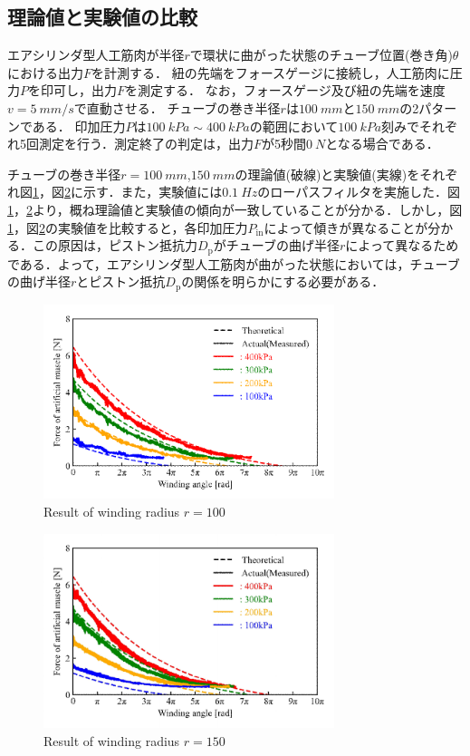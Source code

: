 \subsection{理論値と実験値の比較}%
エアシリンダ型人工筋肉が半径$r$で環状に曲がった状態のチューブ位置(巻き角)$\theta$における出力$F$を計測する．
紐の先端をフォースゲージに接続し，人工筋肉に圧力$P$を印可し，出力$F$を測定する．
なお，フォースゲージ及び紐の先端を速度$v=\SI{5}{mm/s}$で直動させる．
チューブの巻き半径$r$は$\SI{100}{mm}$と$\SI{150}{mm}$の2パターンである．
印加圧力$P$は$\SI{100}{kPa} \sim \SI{400}{kPa}$の範囲において$\SI{100}{kPa}$刻みでそれぞれ5回測定を行う．測定終了の判定は，出力$F$が5秒間$\SI{0}{N}$となる場合である．
\par
チューブの巻き半径$r=\SI{100}{mm}$,$\SI{150}{mm}$の理論値(破線)と実験値(実線)をそれぞれ図\ref{r=100mm}，図\ref{r=150mm}に示す．また，実験値には$\SI{0.1}{Hz}$のローパスフィルタを実施した．図\ref{r=100mm}，\ref{r=150mm}より，概ね理論値と実験値の傾向が一致していることが分かる．しかし，図\ref{r=100mm}，図\ref{r=150mm}の実験値を比較すると，各印加圧力$P_\mathrm{in}$によって傾きが異なることが分かる．この原因は，ピストン抵抗力$D_\mathrm{p}$がチューブの曲げ半径$r$によって異なるためである．よって，エアシリンダ型人工筋肉が曲がった状態においては，チューブの曲げ半径$r$とピストン抵抗$D_\mathrm{p}$の関係を明らかにする必要がある．
\begin{figure}[t]
  \centering
  \includegraphics[width=85mm]{_pdf/result_100mm.pdf}
  \caption{Result of winding radius $r=100$}
  \label{r=100mm}
\end{figure}

\begin{figure}[t]
  \centering
  \includegraphics[width=85mm]{_pdf/result_150mm.pdf}
  \caption{Result of winding radius $r=150$}
  \label{r=150mm}
\end{figure}


